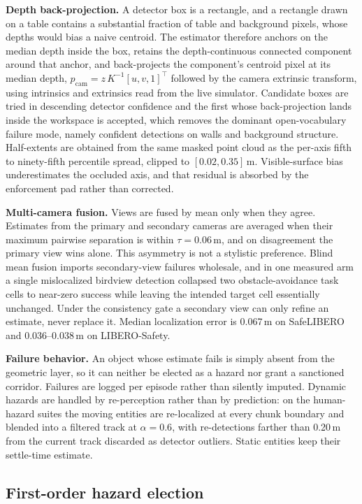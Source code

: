 \textbf{Depth back-projection.} A detector box is a rectangle, and a rectangle
drawn on a table contains a substantial fraction of table and background pixels,
whose depths would bias a naive centroid. The estimator therefore anchors on the
median depth inside the box, retains the depth-continuous connected component
around that anchor, and back-projects the component's centroid pixel at its
median depth, $p_{\mathrm{cam}}=z\,K^{-1}[u,v,1]^{\top}$ followed by the camera
extrinsic transform, using intrinsics and extrinsics read from the live
simulator. Candidate boxes are tried in descending detector confidence and the
first whose back-projection lands inside the workspace is accepted, which
removes the dominant open-vocabulary failure mode, namely confident detections
on walls and background structure. Half-extents are obtained from the same
masked point cloud as the per-axis fifth to ninety-fifth percentile spread,
clipped to $[0.02,0.35]$\,m. Visible-surface bias underestimates the occluded
axis, and that residual is absorbed by the enforcement pad rather than
corrected.

\textbf{Multi-camera fusion.} Views are fused by mean only when they agree.
Estimates from the primary and secondary cameras are averaged when their maximum
pairwise separation is within $\tau=0.06$\,m, and on disagreement the primary
view wins alone. This asymmetry is not a stylistic preference. Blind mean fusion
imports secondary-view failures wholesale, and in one measured arm a single
mislocalized birdview detection collapsed two obstacle-avoidance task cells to
near-zero success while leaving the intended target cell essentially unchanged.
Under the consistency gate a secondary view can only refine an estimate, never
replace it. Median localization error is 0.067\,m on SafeLIBERO and
0.036--0.038\,m on LIBERO-Safety.

\textbf{Failure behavior.} An object whose estimate fails is simply absent from
the geometric layer, so it can neither be elected as a hazard nor grant a
sanctioned corridor. Failures are logged per episode rather than silently
imputed. Dynamic hazards are handled by re-perception rather than by prediction:
on the human-hazard suites the moving entities are re-localized at every chunk
boundary and blended into a filtered track at $\alpha=0.6$, with re-detections
farther than 0.20\,m from the current track discarded as detector outliers.
Static entities keep their settle-time estimate.

\subsection{First-order hazard election}
\label{sec:ident}

